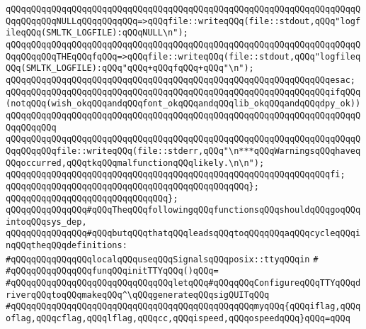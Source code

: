 \verb|qQQqqQQqqQQqqQQqqQQqqQQqqQQqqQQqqQQqqQQqqQQqqQQqqQQqqQQqqQQqqQQqqQQqqQQqqQQqqQQqNULLqQQqqQQqqQQq=>qQQqfile::writeqQQq(file::stdout,qQQq"logfileqQQq(SMLTK_LOGFILE):qQQqNULL\n");|\newline
\verb|qQQqqQQqqQQqqQQqqQQqqQQqqQQqqQQqqQQqqQQqqQQqqQQqqQQqqQQqqQQqqQQqqQQqqQQqqQQqqQQqTHEqQQqfqQQq=>qQQqfile::writeqQQq(file::stdout,qQQq"logfileqQQq(SMLTK_LOGFILE):qQQq"qQQq+qQQqfqQQq+qQQq"\n");|\newline
\verb|qQQqqQQqqQQqqQQqqQQqqQQqqQQqqQQqqQQqqQQqqQQqqQQqqQQqqQQqqQQqqQQqesac;|\newline
\newline
\newline
\verb|qQQqqQQqqQQqqQQqqQQqqQQqqQQqqQQqqQQqqQQqqQQqqQQqqQQqqQQqqQQqqQQqifqQQq(notqQQq(wish_okqQQqandqQQqfont_okqQQqandqQQqlib_okqQQqandqQQqdpy_ok))|\newline
\verb|qQQqqQQqqQQqqQQqqQQqqQQqqQQqqQQqqQQqqQQqqQQqqQQqqQQqqQQqqQQqqQQqqQQqqQQqqQQqqQQq|\newline
\verb|qQQqqQQqqQQqqQQqqQQqqQQqqQQqqQQqqQQqqQQqqQQqqQQqqQQqqQQqqQQqqQQqqQQqqQQqqQQqqQQqfile::writeqQQq(file::stderr,qQQq"\n***qQQqWarningsqQQqhaveqQQqoccurred,qQQqtkqQQqmalfunctionqQQqlikely.\n\n");|\newline
\verb|qQQqqQQqqQQqqQQqqQQqqQQqqQQqqQQqqQQqqQQqqQQqqQQqqQQqqQQqqQQqqQQqfi;|\newline
\verb|qQQqqQQqqQQqqQQqqQQqqQQqqQQqqQQqqQQqqQQqqQQqqQQq};|\newline
\verb|qQQqqQQqqQQqqQQqqQQqqQQqqQQqqQQq};|\newline
\newline
\verb|qQQqqQQqqQQqqQQq#qQQqTheqQQqfollowingqQQqfunctionsqQQqshouldqQQqgoqQQqintoqQQqsys_dep,|\newline
\verb|qQQqqQQqqQQqqQQq#qQQqbutqQQqthatqQQqleadsqQQqtoqQQqqQQqaqQQqcycleqQQqinqQQqtheqQQqdefinitions:|\newline
\newline
\newline
\verb|#qQQqqQQqqQQqqQQqlocalqQQquseqQQqSignalsqQQqposix::ttyqQQqin|\newline
\verb|#|\newline
\verb|#qQQqqQQqqQQqqQQqfunqQQqinitTTYqQQq()qQQq=|\newline
\verb|#qQQqqQQqqQQqqQQqqQQqqQQqqQQqqQQqletqQQq#qQQqqQQqConfigureqQQqTTYqQQqdriverqQQqtoqQQqmakeqQQq^\qQQqgenerateqQQqsigQUITqQQq|\newline
\verb|#qQQqqQQqqQQqqQQqqQQqqQQqqQQqqQQqqQQqqQQqqQQqqQQqmyqQQq{qQQqiflag,qQQqoflag,qQQqcflag,qQQqlflag,qQQqcc,qQQqispeed,qQQqospeedqQQq}qQQq=qQQq|\newline
